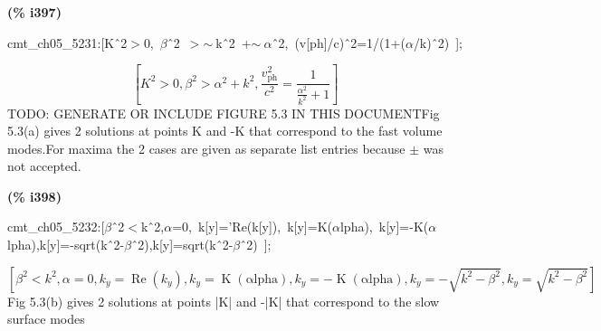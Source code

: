 \documentclass[fleqn]{article}
\begin{document}
\noindent
\begin{minipage}[t]{4.000000em}\color{red}\bfseries
(\% i397)	
\end{minipage}
\begin{minipage}[t]{\textwidth}\color{blue}
cmt\_ch05\_5231:[K\^\ 2\ensuremath{>}0,\ \ensuremath{\beta}\^\ 2\ \ensuremath{>}\ensuremath{\sim\ }k\^\ 2\ +\ensuremath{\sim\ }\ensuremath{\alpha}\^\ 2,\ (v[ph]/c)\^\ 2=1/(1+(\ensuremath{\alpha}/k)\^\ 2)\ ];
\end{minipage}
\[\displaystyle \tag{\% o397} 
\left[ {{K}^{2}}\operatorname{>  }0\operatorname{,}{{\beta }^{2}}\operatorname{>  }{{\alpha }^{2}}+{{k}^{2}}\operatorname{,}\frac{{{v}_{\ensuremath{\mathrm{ph}}}^{2}}}{{{c}^{2}}}=\frac{1}{\frac{{{\alpha }^{2}}}{{{k}^{2}}}+1}\right] \mbox{}
\]
TODO: GENERATE OR INCLUDE FIGURE 5.3 IN THIS DOCUMENTFig 5.3(a) gives 2 solutions at points K and -K that correspond to the fast volume modes.For maxima the 2 cases are given as separate list entries because \ensuremath{\pm} was not accepted.


\noindent
\begin{minipage}[t]{4.000000em}\color{red}\bfseries
(\% i398)	
\end{minipage}
\begin{minipage}[t]{\textwidth}\color{blue}
cmt\_ch05\_5232:[\ensuremath{\beta}\^\ 2\ensuremath{<}k\^\ 2,\ensuremath{\alpha}=0,\ k[y]='Re(k[y]),\ k[y]=K(\ensuremath{\alpha}lpha),\ k[y]=-K(\ensuremath{\alpha}lpha),k[y]=-sqrt(k\^\ 2-\ensuremath{\beta}\^\ 2),k[y]=sqrt(k\^\ 2-\ensuremath{\beta}\^\ 2)\ ];
\end{minipage}
\[\displaystyle \tag{\% o398} 
\operatorname{[}{{\beta }^{2}}\operatorname{<  }{{k}^{2}}\operatorname{,}\alpha =0\operatorname{,}{k_y}=\operatorname{Re}\left( {k_y}\right) \operatorname{,}{k_y}=\operatorname{K}\left( \ensuremath{\mathrm{\alpha lpha}}\right) \operatorname{,}{k_y}=-\operatorname{K}\left( \ensuremath{\mathrm{\alpha lpha}}\right) \operatorname{,}{k_y}=-\sqrt{{{k}^{2}}-{{\beta }^{2}}}\operatorname{,}{k_y}=\sqrt{{{k}^{2}}-{{\beta }^{2}}}\operatorname{]}\mbox{}
\]
Fig 5.3(b) gives 2 solutions at points |K| and -|K| that correspond to the slow surface modes
\end{document}
